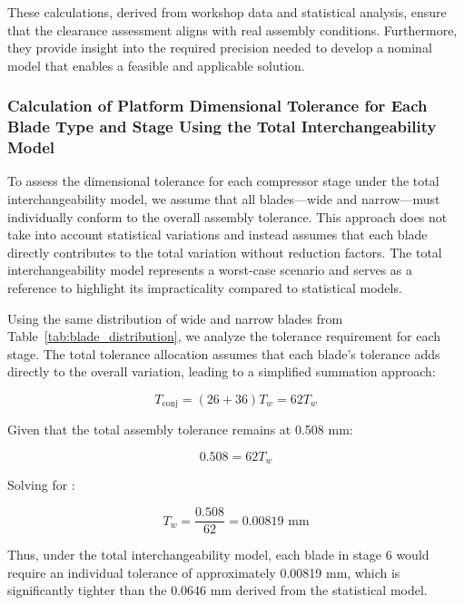 These calculations, derived from workshop data and statistical analysis, ensure that the clearance assessment aligns with real assembly conditions. Furthermore, they provide insight into the required precision needed to develop a nominal model that enables a feasible and applicable solution.

\subsubsection{Calculation of Platform Dimensional Tolerance for Each Blade Type and Stage Using the Total Interchangeability Model}
\label{subsubsec:clearance_calculation2}

To assess the dimensional tolerance for each compressor stage under the total interchangeability model, we assume that all blades—wide and narrow—must individually conform to the overall assembly tolerance. This approach does not take into account statistical variations and instead assumes that each blade directly contributes to the total variation without reduction factors. The total interchangeability model represents a worst-case scenario and serves as a reference to highlight its impracticality compared to statistical models.

Using the same distribution of wide and narrow blades from Table~\ref{tab:blade_distribution}, we analyze the tolerance requirement for each stage. The total tolerance allocation assumes that each blade's tolerance adds directly to the overall variation, leading to a simplified summation approach:

\begin{equation}
T_{\text{conj}} = (26 + 36) T_w = 62 T_w
\end{equation}

Given that the total assembly tolerance remains at 0.508 mm:

\begin{equation}
0.508 = 62 T_w
\end{equation}

Solving for :

\begin{equation}
T_w = \frac{0.508}{62} = 0.00819 \text{ mm}
\end{equation}

Thus, under the total interchangeability model, each blade in stage 6 would require an individual tolerance of approximately 0.00819 mm, which is significantly tighter than the 0.0646 mm derived from the statistical model.

